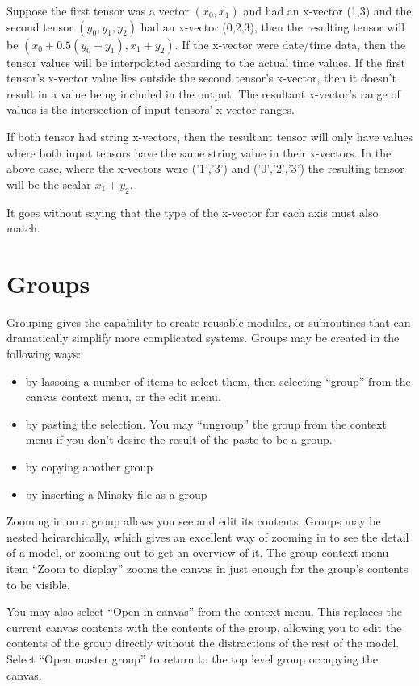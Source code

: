 Suppose the first tensor was a vector $(x_0,x_1)$ and had an x-vector
(1,3) and the second tensor $(y_0,y_1,y_2)$ had an x-vector (0,2,3),
then the resulting tensor will be $(x_0+0.5(y_0+y_1), x_1+y_2)$. If
the x-vector were date/time data, then the tensor values will be
interpolated according to the actual time values. If the first
tensor's x-vector value lies outside the second tensor's x-vector,
then it doesn't result in a value being included in the output. The
resultant x-vector's range of values is the intersection of input
tensors' x-vector ranges.

If both tensor had string x-vectors, then the resultant tensor will
only have values where both input tensors have the same string value
in their x-vectors. In the above case, where the x-vectors were
('1','3') and ('0','2','3') the resulting tensor will be the scalar
$x_1+y_2$.

It goes without saying that the type of the x-vector for each axis
must also match.

\section{Groups}\label{Group}

Grouping gives the capability to create reusable modules, or
subroutines that can dramatically simplify more complicated
systems. Groups may be created in the following ways:
\begin{itemize}
\item by lassoing a number of items to select them, then selecting
  ``group'' from the canvas context menu, or the edit menu.
\item by pasting the selection. You may ``ungroup'' the group from the
  context menu if you don't desire the result of the paste to be a
  group.
\item by copying another group
\item by inserting a Minsky file as a group
\end{itemize}

Zooming in on a group allows you see and edit its contents. Groups may
be nested heirarchically, which gives an excellent way of zooming in
to see the detail of a model, or zooming out to get an overview of
it. The group context menu item ``Zoom to display'' zooms the canvas
in just enough for the group's contents to be visible.

You may also select ``Open in canvas'' from the context menu. This
replaces the current canvas contents with the contents of the group,
allowing you to edit the contents of the group directly without the
distractions of the rest of the model. Select ``Open master group'' to
return to the top level group occupying the canvas.

